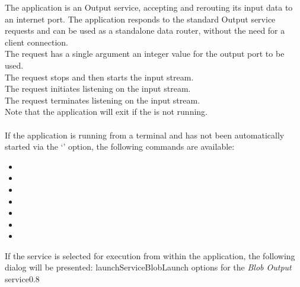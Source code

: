 The  application is an Output service, accepting and
rerouting its input data to an internet port.
The application responds to the standard Output service requests and can be used as a
standalone data router, without the need for a client connection.\\

The  request has a single argument
\longDash{} an integer value for the output port to be used.\\

The  request stops and then
starts the input stream.\\

The  request initiates listening
on the input stream.\\

The  request terminates listening
on the input stream.\\

Note that the application will exit if the  is not
running.\\

\insertAppParameters
{}
\insertOutputServiceComment\\

If the application is running from a terminal and has not been automatically started via
the `' option, the following commands are available:
\begin{itemize}
\item{}
\item\exSp{}
\item\exSp{}
\item\exSp{}
\item\exSp{}
\item\exSp{}
\item\exSp{}
\end{itemize}
\condPage
If the service is selected for execution from within the \emph{\CMU} application, the
following dialog will be presented:
%
{launchServiceBlob}{Launch options for the \emph{Blob Output} service}{0.8}

